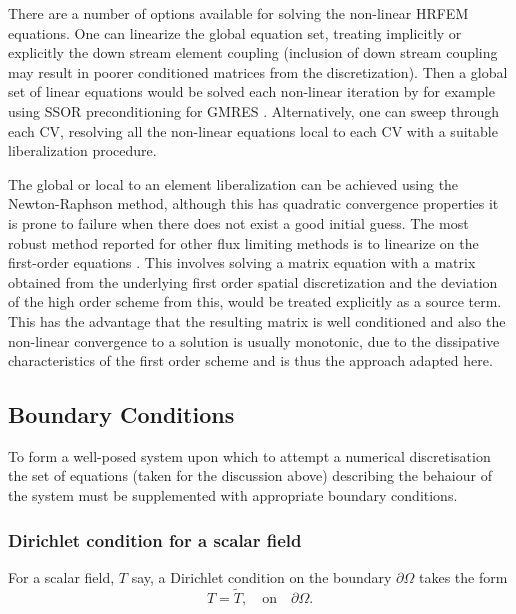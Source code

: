 There are a number of options available for solving the non-linear HRFEM equations. One can linearize the global equation set, treating implicitly or explicitly the down stream element coupling (inclusion of down stream coupling may result in poorer conditioned matrices from the discretization). Then a global set of linear equations would be solved each non-linear iteration by for example using SSOR preconditioning for GMRES \citep{saad_1986}.  Alternatively, one can sweep through each CV, resolving all the non-linear equations local to each CV with a suitable liberalization procedure.

The global or local to an element liberalization can be achieved using the Newton-Raphson method, although this has quadratic convergence properties it is prone to failure when there does not exist a good initial guess. The most robust method reported for other flux limiting methods is to linearize on the first-order equations \citep[see][]{darwish_1993}.  This involves solving a matrix equation with a matrix obtained from the underlying first order spatial discretization and the deviation of the high order scheme from this, would be treated explicitly as a source term. This has the advantage that the resulting matrix is well conditioned and also the non-linear convergence to a solution is usually monotonic, due to the dissipative characteristics of the first order scheme and is thus the approach adapted here.

\subsection{Boundary Conditions}
\label{boundary_conditions_section}
To form a well-posed system upon which to attempt a numerical discretisation the set of equations (taken for the discussion above) describing the behaiour of the system must be supplemented with appropriate boundary conditions.


\subsubsection{Dirichlet condition for a scalar field}\label{sect:bc_scalar_dirichlet}
For a scalar field, $T$ say, a Dirichlet condition on the boundary $\partial\Omega$ takes the form
\begin{equation}
T=\tilde{T},\quad \textrm{on}\quad \partial\Omega.
\end{equation}

